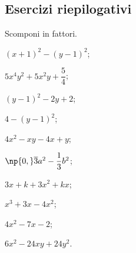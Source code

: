 \subsection{Esercizi riepilogativi}

\begin{esercizio}[\Ast]
 \label{ese:17.19}
 Scomponi in fattori.
 \begin{multicols}{2}
 \begin{enumeratea}
 \item $(x+1)^{2}-(y-1)^{2}$;
\item $5x^{4}y^{2}+5x^{2}y+\dfrac{5}{4}$;
\item $(y-1)^{2}-2y+2$;
\item $4-(y-1)^{2}$;
\item $4x^{2}-xy-4x+y$;
\item $\np{0,}\overline{{3}}a^{2}-\dfrac{1}{3}b^{2}$;
\item $3x+k+3x^{2}+kx$;
\item $x^{3}+3x-4x^{2}$;
\item $4x^{2}-7x-2$;
\item $6x^{2}-24xy+24y^{2}$.
 \end{enumeratea}
 \end{multicols}
\end{esercizio}

